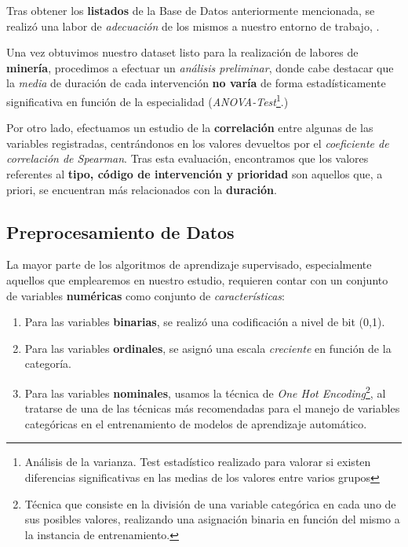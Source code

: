  Tras obtener los \textbf{listados} de la Base de Datos anteriormente mencionada, se realizó una labor de \textit{adecuación} de los mismos a nuestro entorno de trabajo, \cite{McKinney2010DataPython}.



 Una vez obtuvimos nuestro dataset listo para la realización de labores de \textbf{minería}, procedimos a efectuar un \textit{análisis preliminar}, donde cabe destacar que la \textit{media} de duración de cada intervención \textbf{no varía} de forma estadísticamente significativa en función de la especialidad (\textit{ANOVA-Test}\footnote{Análisis de la varianza. Test estadístico realizado para valorar si existen diferencias significativas en las medias de los valores entre varios grupos}.)


 Por otro lado, efectuamos un estudio de la \textbf{correlación} entre algunas de las variables registradas, centrándonos en los valores devueltos por el \textit{coeficiente de correlación de Spearman}\cite{Page1963OrderedRanks}. 
 Tras esta evaluación, encontramos que los valores referentes al \textbf{tipo, código de intervención y prioridad} son aquellos que, a priori, se encuentran más relacionados con la \textbf{duración}.



 \subsection{Preprocesamiento de Datos}

 La mayor parte de los algoritmos de aprendizaje supervisado, especialmente aquellos que emplearemos en nuestro estudio, requieren contar con un conjunto de variables \textbf{numéricas} como conjunto de \textit{características}:
 
 \begin{enumerate}
     \item Para las variables \textbf{binarias}, se realizó una codificación a nivel de bit (0,1).
     \item Para las variables \textbf{ordinales}, se asignó una escala \textit{creciente} en función de la categoría.
     \item Para las variables \textbf{nominales}, usamos la técnica de \textit{One Hot Encoding}\footnote{Técnica que consiste en la división de una variable categórica en cada uno de sus posibles valores, realizando una asignación binaria en función del mismo a la instancia de entrenamiento.}, al tratarse de una de las técnicas más recomendadas para el manejo de variables categóricas en el entrenamiento de modelos de aprendizaje automático\cite{Potdar2017AClassifiers}.
 \end{enumerate}

